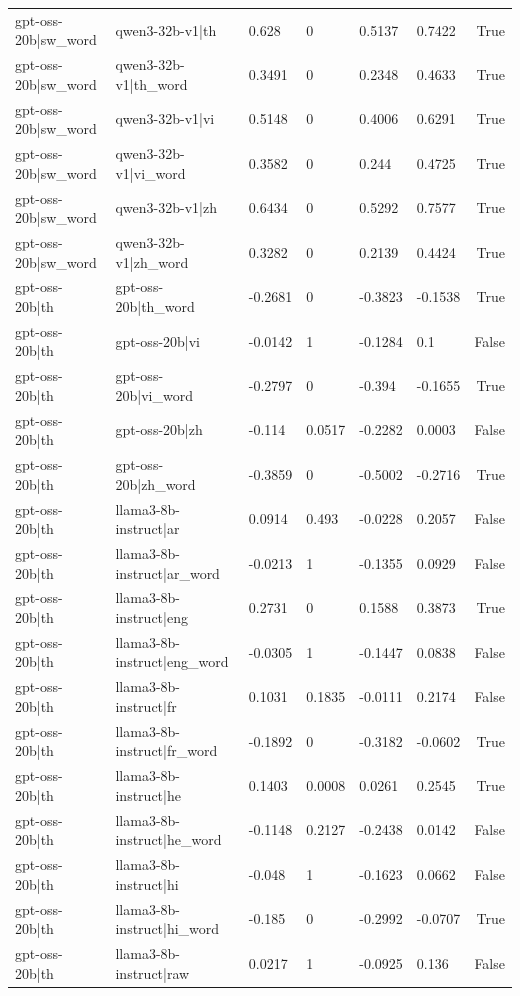 \begin{table}
\begin{tabular}{llllllr}
gpt-oss-20b|sw_word & qwen3-32b-v1|th & 0.628 & 0 & 0.5137 & 0.7422 & True \\
gpt-oss-20b|sw_word & qwen3-32b-v1|th_word & 0.3491 & 0 & 0.2348 & 0.4633 & True \\
gpt-oss-20b|sw_word & qwen3-32b-v1|vi & 0.5148 & 0 & 0.4006 & 0.6291 & True \\
gpt-oss-20b|sw_word & qwen3-32b-v1|vi_word & 0.3582 & 0 & 0.244 & 0.4725 & True \\
gpt-oss-20b|sw_word & qwen3-32b-v1|zh & 0.6434 & 0 & 0.5292 & 0.7577 & True \\
gpt-oss-20b|sw_word & qwen3-32b-v1|zh_word & 0.3282 & 0 & 0.2139 & 0.4424 & True \\
gpt-oss-20b|th & gpt-oss-20b|th_word & -0.2681 & 0 & -0.3823 & -0.1538 & True \\
gpt-oss-20b|th & gpt-oss-20b|vi & -0.0142 & 1 & -0.1284 & 0.1 & False \\
gpt-oss-20b|th & gpt-oss-20b|vi_word & -0.2797 & 0 & -0.394 & -0.1655 & True \\
gpt-oss-20b|th & gpt-oss-20b|zh & -0.114 & 0.0517 & -0.2282 & 0.0003 & False \\
gpt-oss-20b|th & gpt-oss-20b|zh_word & -0.3859 & 0 & -0.5002 & -0.2716 & True \\
gpt-oss-20b|th & llama3-8b-instruct|ar & 0.0914 & 0.493 & -0.0228 & 0.2057 & False \\
gpt-oss-20b|th & llama3-8b-instruct|ar_word & -0.0213 & 1 & -0.1355 & 0.0929 & False \\
gpt-oss-20b|th & llama3-8b-instruct|eng & 0.2731 & 0 & 0.1588 & 0.3873 & True \\
gpt-oss-20b|th & llama3-8b-instruct|eng_word & -0.0305 & 1 & -0.1447 & 0.0838 & False \\
gpt-oss-20b|th & llama3-8b-instruct|fr & 0.1031 & 0.1835 & -0.0111 & 0.2174 & False \\
gpt-oss-20b|th & llama3-8b-instruct|fr_word & -0.1892 & 0 & -0.3182 & -0.0602 & True \\
gpt-oss-20b|th & llama3-8b-instruct|he & 0.1403 & 0.0008 & 0.0261 & 0.2545 & True \\
gpt-oss-20b|th & llama3-8b-instruct|he_word & -0.1148 & 0.2127 & -0.2438 & 0.0142 & False \\
gpt-oss-20b|th & llama3-8b-instruct|hi & -0.048 & 1 & -0.1623 & 0.0662 & False \\
gpt-oss-20b|th & llama3-8b-instruct|hi_word & -0.185 & 0 & -0.2992 & -0.0707 & True \\
gpt-oss-20b|th & llama3-8b-instruct|raw & 0.0217 & 1 & -0.0925 & 0.136 & False \\

\end{tabular}
\end{table}

